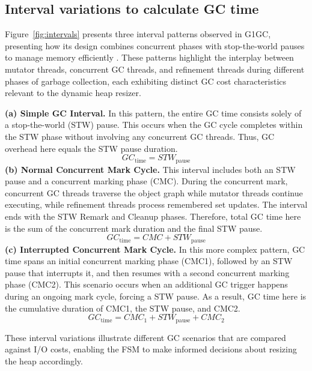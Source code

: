 \subsection{Interval variations to calculate GC time}
Figure~\ref{fig:intervals} presents three interval patterns observed in G1GC, presenting how its design combines concurrent phases with stop-the-world pauses to manage memory efficiently \cite{Detlefs2004GarbageFirst}. These patterns highlight the interplay between mutator threads, concurrent GC threads, and refinement threads during different phases of garbage collection, each exhibiting distinct GC cost characteristics relevant to the dynamic heap resizer.

\textbf{(a) Simple GC Interval.} In this pattern, the entire GC time consists solely of a stop-the-world (STW) pause. This occurs when the GC cycle completes within the STW phase without involving any concurrent GC threads. Thus, GC overhead here equals the STW pause duration. 
\begin{equation}
GC_{\text{time}} = STW_{\text{pause}}
\end{equation}
\textbf{(b) Normal Concurrent Mark Cycle.} This interval includes both an STW pause and a concurrent marking phase (CMC). During the concurrent mark, concurrent GC threads traverse the object graph while mutator threads continue executing, while refinement threads process remembered set updates. The interval ends with the STW Remark and Cleanup phases. Therefore, total GC time here is the sum of the concurrent mark duration and the final STW pause.
\begin{equation}
GC_{\text{time}} = CMC + STW_{\text{pause}}
\end{equation}
\textbf{(c) Interrupted Concurrent Mark Cycle.} In this more complex pattern, GC time spans an initial concurrent marking phase (CMC1), followed by an STW pause that interrupts it, and then resumes with a second concurrent marking phase (CMC2). This scenario occurs when an additional GC trigger happens during an ongoing mark cycle, forcing a STW pause. As a result, GC time here is the cumulative duration of CMC1, the STW pause, and CMC2.
\begin{equation}
  GC_{\text{time}} = CMC_{\text{1}} + STW_{\text{pause}} + CMC_{\text{2}}
\end{equation}

These interval variations illustrate different GC scenarios that are compared against I/O costs, enabling the FSM to make informed decisions about resizing the heap accordingly.

